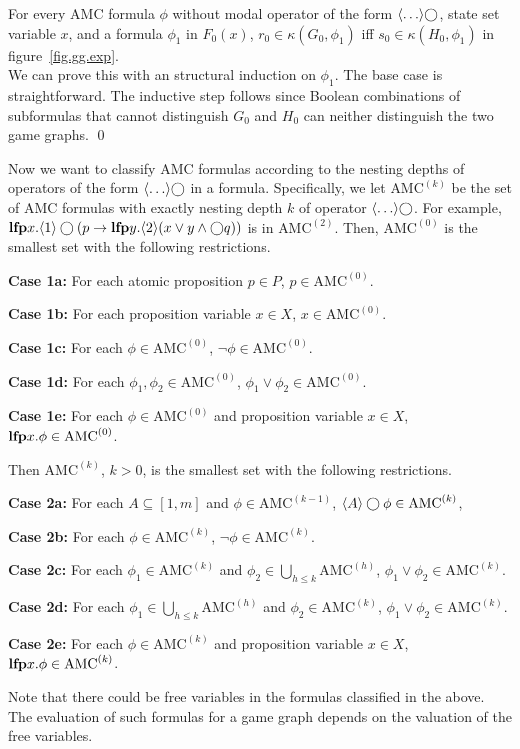 {\lemma \label{lemma.amc.domain}
For every AMC formula $\phi$ without modal operator of the
form $\langle\ldots\rangle\bigcirc$, state set variable $x$, and
a formula $\phi_1$ in $F_0(x)$,
$r_0\in\kappa(G_0,\phi_1)$
iff
$s_0\in\kappa(H_0,\phi_1)$
in figure~\ref{fig.gg.exp}.
}
\\\pf 
We can prove this with an structural induction on $\phi_1$.
The base case is straightforward.
The inductive step follows since Boolean combinations of
subformulas that cannot distinguish $G_0$ and $H_0$ can neither
distinguish the two game graphs.
\qed


Now we want to classify AMC formulas according to the nesting depths of
operators of the form $\langle\ldots\rangle\bigcirc$ in a formula.
Specifically, we let $\mbox{AMC}^{(k)}$ be the set of AMC formulas
with exactly nesting depth $k$ of operator $\langle \ldots\rangle\bigcirc$.
For example,
$\mbox{\bf lfp} x.\langle 1\rangle \bigcirc
(p\rightarrow \mbox{\bf lfp} y.\langle 2\rangle (x\vee y\wedge\bigcirc q))$
is in $\mbox{AMC}^{(2)}$.
Then, $\mbox{AMC}^{(0)}$ is
the smallest set with the following restrictions.
\begin{list1}
\item {\bf Case 1a:} For each atomic proposition $p\in P$,
    $p\in \mbox{AMC}^{(0)}$.
\item {\bf Case 1b:} For each proposition variable $x\in X$,
    $x\in \mbox{AMC}^{(0)}$.
\item {\bf Case 1c:} For each $\phi\in \mbox{AMC}^{(0)}$,
    $\neg\phi\in \mbox{AMC}^{(0)}$.
\item {\bf Case 1d:} For each $\phi_1,\phi_2\in \mbox{AMC}^{(0)}$,
    $\phi_1\vee\phi_2\in \mbox{AMC}^{(0)}$.
\item {\bf Case 1e:} For each $\phi\in \mbox{AMC}^{(0)}$ and
    proposition variable $x\in X$,
    $\mbox{\bf lfp} x.\phi\in \mbox{AMC}^{(0)}$.
\end{list1}
Then $\mbox{AMC}^{(k)}$, $k>0$,
is the smallest set with the following restrictions.
\begin{list1}
\item {\bf Case 2a:} For each $A\subseteq [1,m]$ and
    $\phi\in \mbox{AMC}^{(k-1)}$,
    $\langle A\rangle \bigcirc \phi\in \mbox{AMC}^{(k)}$,
\item {\bf Case 2b:} For each $\phi\in \mbox{AMC}^{(k)}$,
    $\neg\phi\in \mbox{AMC}^{(k)}$.
\item {\bf Case 2c:} For each $\phi_1\in \mbox{AMC}^{(k)}$ and
    $\phi_2\in\bigcup_{h\leq k}\mbox{AMC}^{(h)}$,
    $\phi_1\vee\phi_2\in \mbox{AMC}^{(k)}$.
\item {\bf Case 2d:} For each
    $\phi_1\in\bigcup_{h\leq k}\mbox{AMC}^{(h)}$ and $\phi_2\in \mbox{AMC}^{(k)}$,
    $\phi_1\vee\phi_2\in \mbox{AMC}^{(k)}$.
\item {\bf Case 2e:} For each $\phi\in \mbox{AMC}^{(k)}$ and
    proposition variable $x\in X$,
    $\mbox{\bf lfp} x.\phi\in \mbox{AMC}^{(k)}$.
\end{list1}
Note that there could be free variables in the formulas classified in
the above.
The evaluation of such formulas for a game graph depends on the
valuation of the free variables.

